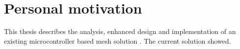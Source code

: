 \section{Personal motivation}
This thesis describes the analysis, enhanced design and implementation of an existing microcontroller based mesh solution \cite{korniowski}. The current solution showed.
